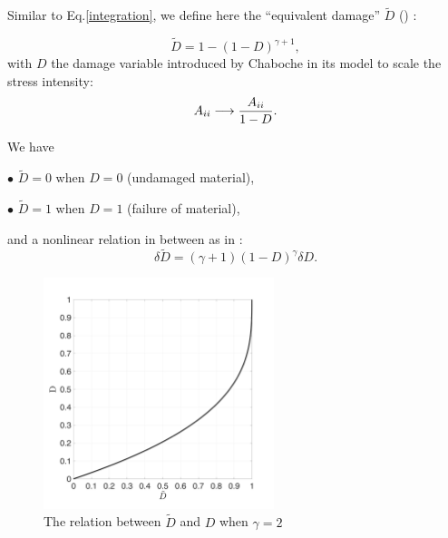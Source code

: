 %
%

Similar to Eq.\eqref{integration}, we define here the ``equivalent damage'' $\tilde{D}$ () :

\begin{equation}
\tilde{D}=1-(1-D)^{\gamma+1},
\label{eq.Dhat}
\end{equation}
with $D$ the damage variable introduced by Chaboche in its model to scale the stress intensity:
$${A}_{\uppercase\expandafter{\romannumeral2}} \longrightarrow \dfrac{{A}_{\uppercase\expandafter{\romannumeral2}}}{1-D}.$$

We have 

$\bullet$ $\tilde{D}=0$ when $D=0$ (undamaged material),

$\bullet$ $\tilde{D}=1$ when $D=1$ (failure of material),	

and a nonlinear relation in between as in :
$$\delta\tilde{D}=\left(\gamma+1 \right)\left( 1-D\right)^\gamma \delta D.$$	
\begin{figure}
\centering
\includegraphics[width=0.6\textwidth]{figures//Dhat.png} 
\caption{The relation between $\tilde{D}$ and $D$ when $\gamma=2$}
\label{fig.Dhat}
\end{figure}

